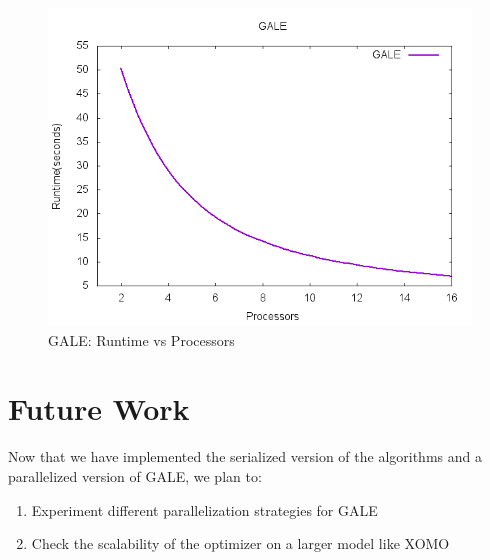 \documentclass[conference]{IEEEtran}
\begin{document}
	\begin{figure}[h]
		\begin{mdframed}
			\includegraphics[width=\linewidth]{img/gale_processors}
		\end{mdframed}
		\caption{GALE: Runtime vs Processors}	
		\label{fig:gale_runtime}
	\end{figure}
	
	\section{Future Work}
	\label{future}
	
	Now that we have implemented the serialized version of the algorithms and a parallelized version of GALE, we plan to:
	\begin{enumerate}
		\item Experiment different parallelization strategies for GALE
		\item Check the scalability of the optimizer on a larger model like XOMO\cite{menzies05xomo}
	\end{enumerate}
	\newpage
	
	
\end{document}
